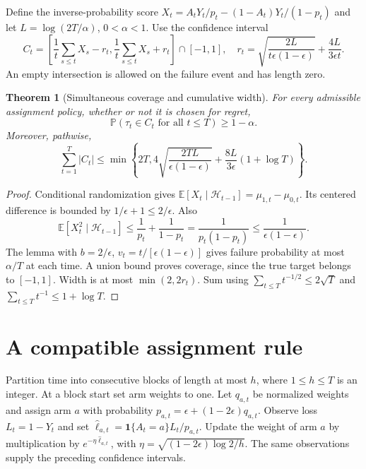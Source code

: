\documentclass[11pt]{article}
\newtheorem{theorem}{Theorem}
\theoremstyle{remark}\newtheorem{remark}[theorem]{Remark}
\newcommand{\E}{\mathbb E}
\newcommand{\Prb}{\mathbb P}
\newcommand{\ind}{\mathbf 1}
\begin{document}
Define the inverse-probability score
$X_t=A_tY_t/p_t-(1-A_t)Y_t/(1-p_t)$ and let
$L=\log(2T/\alpha)$, $0<\alpha<1$. Use the confidence interval
\[
 C_t=\left[\frac1t\sum_{s\le t}X_s-r_t,
 \frac1t\sum_{s\le t}X_s+r_t\right]\cap[-1,1],
\quad
 r_t=\sqrt{\frac{2L}{t\epsilon(1-\epsilon)}}+
 \frac{4L}{3\epsilon t}.
\]
An empty intersection is allowed on the failure event and has length zero.

\begin{theorem}[Simultaneous coverage and cumulative width]
For every admissible assignment policy, whether or not it is chosen for regret,
\[
 \Prb(\tau_t\in C_t\text{ for all }t\le T)\ge1-\alpha.
\]
Moreover, pathwise,
\[
 \sum_{t=1}^T|C_t|\le
 \min\left\{2T,
 4\sqrt{\frac{2TL}{\epsilon(1-\epsilon)}}+
 \frac{8L}{3\epsilon}(1+\log T)\right\}.
\]
\end{theorem}
\begin{proof}
Conditional randomization gives $\E[X_t\mid\mathcal H_{t-1}]=\mu_{1,t}-\mu_{0,t}$. Its centered difference is bounded by $1/\epsilon+1\le2/\epsilon$. Also
\[
 \E[X_t^2\mid\mathcal H_{t-1}]
 \le\frac1{p_t}+\frac1{1-p_t}
 =\frac1{p_t(1-p_t)}\le\frac1{\epsilon(1-\epsilon)}.
\]
The lemma with $b=2/\epsilon$, $v_t=t/[\epsilon(1-\epsilon)]$ gives failure probability at most $\alpha/T$ at each time. A union bound proves coverage, since the true target belongs to $[-1,1]$. Width is at most $\min(2,2r_t)$. Sum using $\sum_{t\le T}t^{-1/2}\le2\sqrt T$ and $\sum_{t\le T}t^{-1}\le1+\log T$.
\end{proof}

\section*{A compatible assignment rule}
Partition time into consecutive blocks of length at most $h$, where $1\le h\le T$ is an integer. At a block start set arm weights to one. Let $q_{a,t}$ be normalized weights and assign arm $a$ with probability
$p_{a,t}=\epsilon+(1-2\epsilon)q_{a,t}$. Observe loss $L_t=1-Y_t$ and set
$\widehat\ell_{a,t}=\ind\{A_t=a\}L_t/p_{a,t}$.
Update the weight of arm $a$ by multiplication by $e^{-\eta\widehat\ell_{a,t}}$, with $\eta=\sqrt{(1-2\epsilon)\log2/h}$. The same observations supply the preceding confidence intervals.
\end{document}
